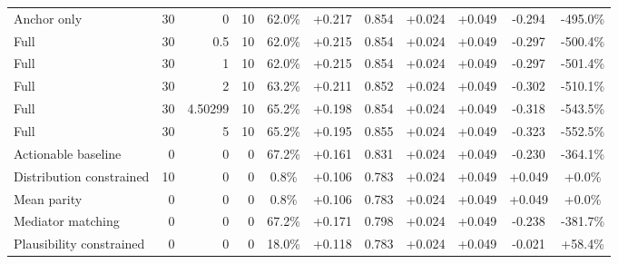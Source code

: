 \begin{table}[htbp]
\begin{tabular}{lrrrccccccc}
Anchor only & 30 & 0 & 10 & 62.0\% & +0.217 & 0.854 & +0.024 & +0.049 & -0.294 & -495.0\% \\
Full & 30 & 0.5 & 10 & 62.0\% & +0.215 & 0.854 & +0.024 & +0.049 & -0.297 & -500.4\% \\
Full & 30 & 1 & 10 & 62.0\% & +0.215 & 0.854 & +0.024 & +0.049 & -0.297 & -501.4\% \\
Full & 30 & 2 & 10 & 63.2\% & +0.211 & 0.852 & +0.024 & +0.049 & -0.302 & -510.1\% \\
Full & 30 & 4.50299 & 10 & 65.2\% & +0.198 & 0.854 & +0.024 & +0.049 & -0.318 & -543.5\% \\
Full & 30 & 5 & 10 & 65.2\% & +0.195 & 0.855 & +0.024 & +0.049 & -0.323 & -552.5\% \\
Actionable baseline & 0 & 0 & 0 & 67.2\% & +0.161 & 0.831 & +0.024 & +0.049 & -0.230 & -364.1\% \\
Distribution constrained & 10 & 0 & 0 & 0.8\% & +0.106 & 0.783 & +0.024 & +0.049 & +0.049 & +0.0\% \\
Mean parity & 0 & 0 & 0 & 0.8\% & +0.106 & 0.783 & +0.024 & +0.049 & +0.049 & +0.0\% \\
Mediator matching & 0 & 0 & 0 & 67.2\% & +0.171 & 0.798 & +0.024 & +0.049 & -0.238 & -381.7\% \\
Plausibility constrained & 0 & 0 & 0 & 18.0\% & +0.118 & 0.783 & +0.024 & +0.049 & -0.021 & +58.4\% \\
\bottomrule
\end{tabular}
\end{table}